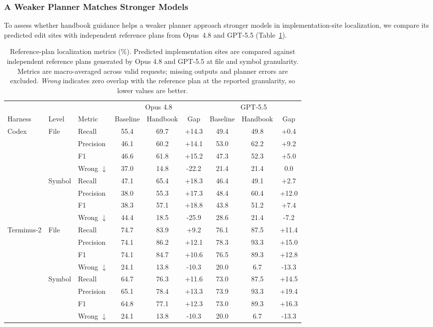 \documentclass[]{ailab}
\begin{document}
\subsubsection{A Weaker Planner Matches Stronger Models}

To assess whether handbook guidance helps a weaker planner approach stronger
models in implementation-site localization, we compare its predicted edit sites
with independent reference plans from Opus~4.8 and GPT-5.5
(Table~\ref{tab:answer-key-localization}).

\begin{table}[t]
\centering
\small
\caption{Reference-plan localization metrics (\%). Predicted implementation
sites are compared against independent reference plans generated by Opus 4.8
and GPT-5.5 at file and symbol granularity. Metrics are macro-averaged across
valid requests; missing outputs and planner errors are excluded. \emph{Wrong}
indicates zero overlap with the reference plan at the reported granularity, so
lower values are better.}
\label{tab:answer-key-localization}
\setlength{\tabcolsep}{3pt}
\begin{tabular}{@{}lllccc ccc@{}}
\toprule
& & & \multicolumn{3}{c}{Opus 4.8} & \multicolumn{3}{c}{GPT-5.5} \\
\cmidrule(lr){4-6}\cmidrule(lr){7-9}
Harness & Level & Metric & Baseline & Handbook & Gap & Baseline & Handbook & Gap \\
\midrule
\multirow{8}{*}{Codex}
& \multirow{4}{*}{File} & Recall & 55.4 & 69.7 & +14.3 & 49.4 & 49.8 & +0.4 \\
& & Precision & 46.1 & 60.2 & +14.1 & 53.0 & 62.2 & +9.2 \\
& & F1 & 46.6 & 61.8 & +15.2 & 47.3 & 52.3 & +5.0 \\
& & Wrong $\downarrow$ & 37.0 & 14.8 & -22.2 & 21.4 & 21.4 & 0.0 \\
\cmidrule(l){2-9}
& \multirow{4}{*}{Symbol} & Recall & 47.1 & 65.4 & +18.3 & 46.4 & 49.1 & +2.7 \\
& & Precision & 38.0 & 55.3 & +17.3 & 48.4 & 60.4 & +12.0 \\
& & F1 & 38.3 & 57.1 & +18.8 & 43.8 & 51.2 & +7.4 \\
& & Wrong $\downarrow$ & 44.4 & 18.5 & -25.9 & 28.6 & 21.4 & -7.2 \\
\midrule
\multirow{8}{*}{Terminus-2}
& \multirow{4}{*}{File} & Recall & 74.7 & 83.9 & +9.2 & 76.1 & 87.5 & +11.4 \\
& & Precision & 74.1 & 86.2 & +12.1 & 78.3 & 93.3 & +15.0 \\
& & F1 & 74.1 & 84.7 & +10.6 & 76.5 & 89.3 & +12.8 \\
& & Wrong $\downarrow$ & 24.1 & 13.8 & -10.3 & 20.0 & 6.7 & -13.3 \\
\cmidrule(l){2-9}
& \multirow{4}{*}{Symbol} & Recall & 64.7 & 76.3 & +11.6 & 73.0 & 87.5 & +14.5 \\
& & Precision & 65.1 & 78.4 & +13.3 & 73.9 & 93.3 & +19.4 \\
& & F1 & 64.8 & 77.1 & +12.3 & 73.0 & 89.3 & +16.3 \\
& & Wrong $\downarrow$ & 24.1 & 13.8 & -10.3 & 20.0 & 6.7 & -13.3 \\
\bottomrule
\end{tabular}
\end{table}
\end{document}
